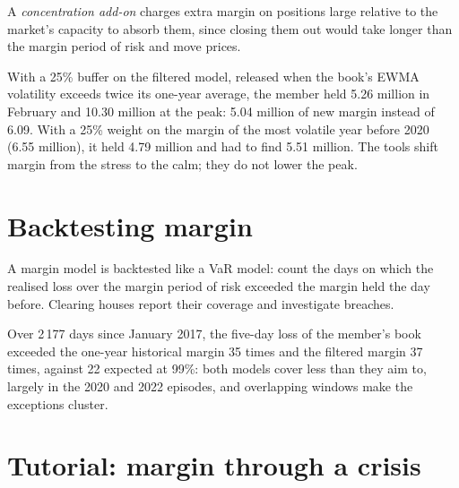 \begin{definition}\label{def:rc:margin-models:conc}
A \emph{concentration add-on} charges extra margin on positions large
relative to the market's capacity to absorb them, since closing them out would take longer than the
margin period of risk and move prices.
\end{definition}

\label{lst:rc:margin-models:apc}

\begin{example}\label{ex:rc:margin-models:apc}
With a 25\% buffer on the filtered model, released when the book's EWMA volatility exceeds twice its
one-year average, the member held 5.26 million in February and 10.30 million at the peak: 5.04 million
of new margin instead of 6.09. With a 25\% weight on the margin of the most volatile year before 2020
(6.55 million), it held 4.79 million and had to find 5.51 million. The tools shift margin from the stress
to the calm; they do not lower the peak.
\end{example}

\section{Backtesting margin}

A margin model is backtested like a VaR model: count the days on which the realised loss over the
margin period of risk exceeded the margin held the day before. Clearing houses report their coverage
and investigate breaches.

\begin{example}\label{ex:rc:margin-models:backtest}
Over 2\,177 days since January 2017, the five-day loss of the member's book exceeded the one-year
historical margin 35 times and the filtered margin 37 times, against 22 expected at 99\%: both models
cover less than they aim to, largely in the 2020 and 2022 episodes, and overlapping windows make the
exceptions cluster.
\end{example}

\section{Tutorial: margin through a crisis}\label{tut:rc:margin-models:tutorial}

